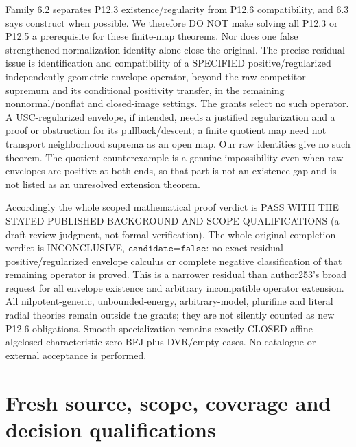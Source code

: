 \documentclass[11pt]{article}
\begin{document}
Family 6.2 separates P12.3 existence/regularity from P12.6 compatibility, and 6.3 says construct when possible. We therefore DO NOT make solving all P12.3 or P12.5 a prerequisite for these finite-map theorems. Nor does one false strengthened normalization identity alone close the original. The precise residual issue is identification and compatibility of a SPECIFIED positive/regularized independently geometric envelope operator, beyond the raw competitor supremum and its conditional positivity transfer, in the remaining nonnormal/nonflat and closed-image settings. The grants select no such operator. A USC-regularized envelope, if intended, needs a justified regularization and a proof or obstruction for its pullback/descent; a finite quotient map need not transport neighborhood suprema as an open map. Our raw identities give no such theorem. The quotient counterexample is a genuine impossibility even when raw envelopes are positive at both ends, so that part is not an existence gap and is not listed as an unresolved extension theorem.

Accordingly the whole scoped mathematical proof verdict is PASS WITH THE STATED PUBLISHED-BACKGROUND AND SCOPE QUALIFICATIONS (a draft review judgment, not formal verification). The whole-original completion verdict is INCONCLUSIVE, $\texttt{candidate=false}$: no exact residual positive/regularized envelope calculus or complete negative classification of that remaining operator is proved. This is a narrower residual than author253's broad request for all envelope existence and arbitrary incompatible operator extension. All nilpotent-generic, unbounded-energy, arbitrary-model, plurifine and literal radial theories remain outside the grants; they are not silently counted as new P12.6 obligations. Smooth specialization remains exactly CLOSED affine algclosed characteristic zero BFJ plus DVR/empty cases. No catalogue or external acceptance is performed.

\appendix
\section{Fresh source, scope, coverage and decision qualifications}
\end{document}

